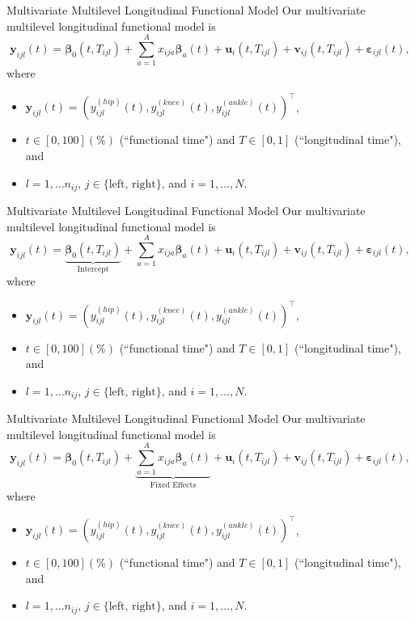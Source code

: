 \documentclass[aspectratio=128,xcolor=dvipsnames, notes]{beamer}
\newcommand{\1}{\mathbf{1}}
\newcommand{\boldbeta}{\boldsymbol{\beta}}
\newcommand{\boldy}{\mathbf{y}}
\begin{document}
\begin{frame}{Multivariate Multilevel Longitudinal Functional Model \parencite{gunning_multivariate_2023}}
Our multivariate multilevel longitudinal functional model is 
$$
\boldy_{ijl} (t) = \boldbeta_0(t, T_{ijl}) + \sum_{a=1}^A x_{ija} \boldbeta_{a} (t) + \mathbf{u}_{i} (t, T_{ijl}) + \mathbf{v}_{ij} (t, T_{ijl}) + \boldsymbol{\varepsilon}_{ijl} (t),
$$
where
\begin{itemize}
\small
    \item $\boldy_{ijl} (t) = \left(y_{ijl}^{(hip)} (t), y_{ijl}^{(knee)} (t), y_{ijl}^{(ankle)} (t)\right)^\top$,
    \item $t \in [0, 100](\%)$ (``functional time") and $T \in [0, 1]$ (``longitudinal time"), and
    \item $l = 1, \dots n_{ij}$, $j \in \{\text{left, right}\}$, and $i = 1, \dots, N$.
\end{itemize}
\end{frame}

\begin{frame}[noframenumbering]{Multivariate Multilevel Longitudinal Functional Model \parencite{gunning_multivariate_2023}}
Our multivariate multilevel longitudinal functional model is 
$$
\boldy_{ijl} (t) = \underbrace{\boldbeta_0(t, T_{ijl})}_{\text{Intercept}} + \sum_{a=1}^A x_{ija} \boldbeta_{a} (t) + \mathbf{u}_{i} (t, T_{ijl}) + \mathbf{v}_{ij} (t, T_{ijl}) + \boldsymbol{\varepsilon}_{ijl} (t),
$$
where
\begin{itemize}
\small
    \item $\boldy_{ijl} (t) = \left(y_{ijl}^{(hip)} (t), y_{ijl}^{(knee)} (t), y_{ijl}^{(ankle)} (t)\right)^\top$,
    \item $t \in [0, 100](\%)$ (``functional time") and $T \in [0, 1]$ (``longitudinal time"), and
    \item $l = 1, \dots n_{ij}$, $j \in \{\text{left, right}\}$, and $i = 1, \dots, N$.
\end{itemize}
\end{frame}

\begin{frame}[noframenumbering]{Multivariate Multilevel Longitudinal Functional Model \parencite{gunning_multivariate_2023}}
Our multivariate multilevel longitudinal functional model is 
$$
\boldy_{ijl} (t) = \boldbeta_0(t, T_{ijl}) + \underbrace{\sum_{a=1}^A x_{ija} \boldbeta_{a} (t)}_{\text{Fixed Effects}} + \mathbf{u}_{i} (t, T_{ijl}) + \mathbf{v}_{ij} (t, T_{ijl}) + \boldsymbol{\varepsilon}_{ijl} (t),
$$
where
\begin{itemize}
\small
    \item $\boldy_{ijl} (t) = \left(y_{ijl}^{(hip)} (t), y_{ijl}^{(knee)} (t), y_{ijl}^{(ankle)} (t)\right)^\top$,
    \item $t \in [0, 100](\%)$ (``functional time") and $T \in [0, 1]$ (``longitudinal time"), and
    \item $l = 1, \dots n_{ij}$, $j \in \{\text{left, right}\}$, and $i = 1, \dots, N$.
\end{itemize}
\end{frame}
\end{document}
